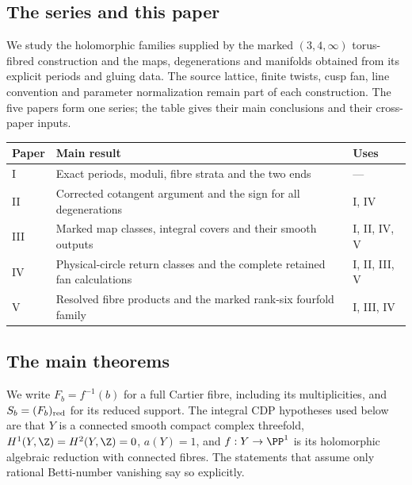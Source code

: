 \subsection{The series and this paper}
We study the holomorphic families supplied by the marked
$(3,4,\infty)$ torus-fibred construction and the maps, degenerations
and manifolds obtained from its explicit periods and gluing data.
The source lattice, finite twists, cusp fan, line convention and
parameter normalization remain part of each construction. The five
papers form one series; the table gives their main conclusions and
their cross-paper inputs.
\begin{center}\small
\begin{tabularx}{\textwidth}{@{}lXl@{}}\toprule
Paper & Main result & Uses\\\midrule
I & Exact periods, moduli, fibre strata and the two ends & ---\\
II & Corrected cotangent argument and the sign for all degenerations & I, IV\\
III & Marked map classes, integral covers and their smooth outputs & I, II, IV, V\\
IV & Physical-circle return classes and the complete retained fan calculations & I, II, III, V\\
V & Resolved fibre products and the marked rank-six fourfold family & I, III, IV\\
\bottomrule\end{tabularx}\end{center}

\subsection{The main theorems}
\hypertarget{tag-03K1}{}\label{series:II:main-theorems}

We write $F_b=f^{-1}(b)$ for a full Cartier fibre, including its
multiplicities, and $S_b=(F_b)_{\rm red}$ for its reduced support.
The integral CDP hypotheses used below are that $Y$ is a connected
smooth compact complex threefold, $H^1(Y,\Z)=H^2(Y,\Z)=0$,
$a(Y)=1$, and $f:Y\to\PP^1$ is its holomorphic algebraic reduction
with connected fibres. The statements that assume only rational
Betti-number vanishing say so explicitly.

